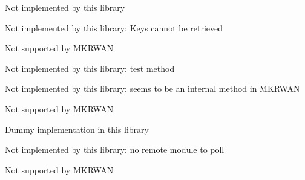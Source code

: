 \begin{DoxyRefList}
%
 Not implemented by this library  
\item[Member \mbox{\hyperlink{classSTM32LoRaWAN_a190e38032336a2d69927724fbe872f17}{S\+T\+M32\+Lo\+Ra\+W\+AN::get\+Nwk\+S\+Key}} ()]\label{extensions__extensions000025}%
%
 Not implemented by this library\+: Keys cannot be retrieved  
\item[Member \mbox{\hyperlink{classSTM32LoRaWAN_a01ff41259ed00ec882e33eb0e33b72c2}{S\+T\+M32\+Lo\+Ra\+W\+AN::get\+Port}} ()]\label{extensions__extensions000003}%
%
 Not supported by M\+K\+R\+W\+AN  
\item[Member \mbox{\hyperlink{classSTM32LoRaWAN_a5c4031e2de24b5f3066603e71e37a2ae}{S\+T\+M32\+Lo\+Ra\+W\+AN::get\+T\+Conf}} ()]\label{extensions__extensions000014}%
%
 Not implemented by this library\+: test method  
\item[Member \mbox{\hyperlink{classSTM32LoRaWAN_ac49cddab0119f98ae926e53aa11e16f2}{S\+T\+M32\+Lo\+Ra\+W\+AN::init}} ()]\label{extensions__extensions000023}%
%
 Not implemented by this library\+: seems to be an internal method in M\+K\+R\+W\+AN  
\item[Member \mbox{\hyperlink{classSTM32LoRaWAN_afd305ad1b2327c96fd1bd94c41c6fb46}{S\+T\+M32\+Lo\+Ra\+W\+AN::maintain\+Until\+Idle}} ()]\label{extensions__extensions000001}%
%
 Not supported by M\+K\+R\+W\+AN  
\item[Member \mbox{\hyperlink{classSTM32LoRaWAN_ad98e9a94a0a991742a433ce1dd67ec84}{S\+T\+M32\+Lo\+Ra\+W\+AN::min\+Poll\+Interval}} (unsigned long)]\label{extensions__extensions000032}%
%
 Dummy implementation in this library  
\item[Member \mbox{\hyperlink{classSTM32LoRaWAN_a79634164ef1e9c2d8c4d4589cbeaf665}{S\+T\+M32\+Lo\+Ra\+W\+AN::poll}} ()]\label{extensions__extensions000018}%
%
 Not implemented by this library\+: no remote module to poll  
\item[Member \mbox{\hyperlink{classSTM32LoRaWAN_ac720f4ea2f3efe054908a8f8bdcfc7a5}{S\+T\+M32\+Lo\+Ra\+W\+AN::powerdB}} (int8\+\_\+t db)]\label{extensions__extensions000002}%
%
 Not supported by M\+K\+R\+W\+AN  
\item[Member \mbox{\hyperlink{classSTM32LoRaWAN_a8a715c4ec0ba3a9601a229a8c43d05be}{S\+T\+M32\+Lo\+Ra\+W\+AN::restart}} ()]\label{extensions__extensions000017}%

\end{DoxyRefList}
